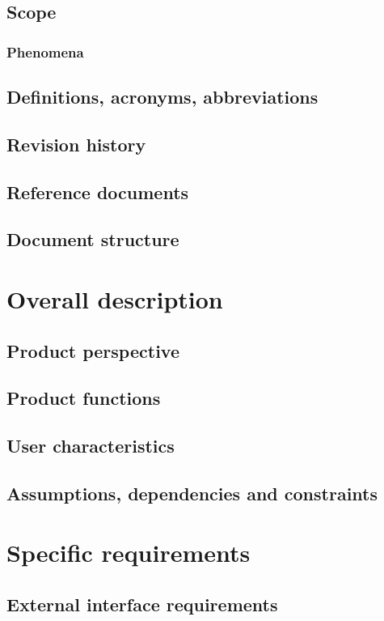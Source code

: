\documentclass{article}
\begin{document}
\subsection{Scope}
\subsubsection{Phenomena}
\subsection{Definitions, acronyms, abbreviations}
\subsection{Revision history}
\subsection{Reference documents}
\subsection{Document structure}

\section{Overall description}
\subsection{Product perspective}
\subsection{Product functions}
\subsection{User characteristics}
\subsection{Assumptions, dependencies and constraints}

\section{Specific requirements}
\subsection{External interface requirements}
\end{document}
